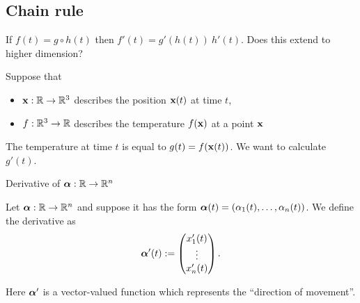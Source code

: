 
% 

\subsection*{Chain rule}

If \(f(t) = g\circ h(t)\) then \(f'(t) = g'(h(t)) \ h'(t)\).
Does this extend to higher dimension?

\begin{example*}
    Suppose that
    \begin{itemize}
        \item \(\mathbf{x}:\mathbb{R} \to \mathbb{R}^3\) describes the position \(\mathbf{x}(t)\) at time \(t\),
        \item \(f:\mathbb{R}^3 \to \mathbb{R}\) describes the temperature \(f(\mathbf{x})\) at a point \(\mathbf{x}\)
    \end{itemize}

    The temperature at time \(t\) is equal to \(g(t)=f(\mathbf{x}(t))\).
    We want to calculate \(g'(t)\).
\end{example*}






{Derivative of \(\boldsymbol{\alpha}:\mathbb{R} \to \mathbb{R}^n\)}


Let \(\boldsymbol{\alpha}:\mathbb{R} \to \mathbb{R}^n\) and suppose it has the form
\(\boldsymbol{\alpha}(t) = \left( \alpha_1(t), \ldots, \alpha_n(t)  \right)\).
We define the derivative as
\[
    \aalpha'(t) := \begin{pmatrix}
        x_1'(t) \\
        \vdots  \\
        x_n'(t)
    \end{pmatrix}.  %
\]

Here \(\boldsymbol{\alpha}'\) is a vector-valued function which represents the ``direction of movement''.



